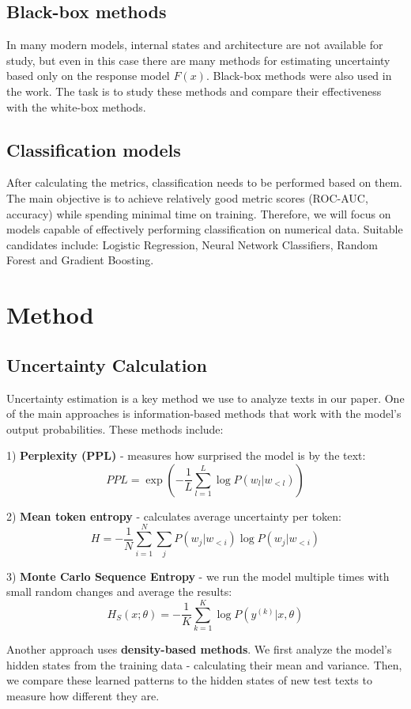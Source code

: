 \documentclass[a4paper, 12pt]{article}
\begin{document}
\subsection {Black-box methods}   
In many modern models, internal states and architecture are not available for study, but even in this case there are many methods for estimating uncertainty based only on the response model \(F(x)\). Black-box methods were also used in the work\citep{Polygraph}. The task is to study these methods and compare their effectiveness with the white-box methods. 

\subsection{Classification models}

After calculating the metrics, classification needs to be performed based on them. The main objective is to achieve relatively good metric scores (ROC-AUC, accuracy) while spending minimal time on training. Therefore, we will focus on models capable of effectively performing classification on numerical data. Suitable candidates include: Logistic Regression, Neural Network Classifiers, Random Forest and Gradient Boosting.

\section{Method}
\subsection{Uncertainty Calculation}
Uncertainty estimation is a key method we use to analyze texts in our paper. One of the main approaches is information-based methods that work with the model's output probabilities. These methods include:

1) \textbf{Perplexity (PPL)} - measures how surprised the model is by the text:
$$PPL = \exp\left(-\frac{1}{L} \sum_{l=1}^{L} \log P(w_l | w_{<l})\right)$$

2) \textbf{Mean token entropy} - calculates average uncertainty per token:
$$H = -\frac{1}{N} \sum_{i=1}^{N} \sum_{j} P(w_j | w_{<i}) \log P(w_j | w_{<i})$$

3) \textbf{Monte Carlo Sequence Entropy} - we run the model multiple times with small random changes and average the results:
$$H_S(x; \theta) = - \frac{1}{K} \sum_{k=1}^{K} \log P(y^{(k)} | x, \theta)$$

Another approach uses \textbf{density-based methods}. We first analyze the model's hidden states from the training data - calculating their mean and variance. Then, we compare these learned patterns to the hidden states of new test texts to measure how different they are.
\end{document}
